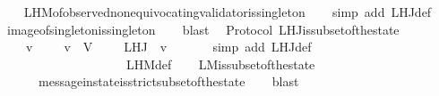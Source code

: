 \begin{isabellebody}
%
\isadelimproof
\ \ %
\endisadelimproof
%
\isatagproof
{}\isamarkupfalse%
\ L{\isacharunderscore}H{\isacharunderscore}M{\isacharunderscore}of{\isacharunderscore}observed{\isacharunderscore}non{\isacharunderscore}equivocating{\isacharunderscore}validator{\isacharunderscore}is{\isacharunderscore}singleton\isanewline
\ \ \isamarkupfalse%
\ {\isacharparenleft}simp\ add{\isacharcolon}\ L{\isacharunderscore}H{\isacharunderscore}J{\isacharunderscore}def{\isacharparenright}\isanewline
\ \ \isamarkupfalse%
\ image{\isacharunderscore}of{\isacharunderscore}singleton{\isacharunderscore}is{\isacharunderscore}singleton\isanewline
\ \ \isamarkupfalse%
\ blast%
\endisatagproof
{\isafoldproof}%
%
\isadelimproof
\isanewline
%
\endisadelimproof
\isanewline
{}\isamarkupfalse%
\ {\isacharparenleft}\ Protocol{\isacharparenright}\ L{\isacharunderscore}H{\isacharunderscore}J{\isacharunderscore}is{\isacharunderscore}subset{\isacharunderscore}of{\isacharunderscore}the{\isacharunderscore}state\ {\isacharcolon}\isanewline
\ \ {\isachardoublequoteopen}{\isasymforall}\ {\isasymsigma}\ v{\isachardot}\ {\isasymsigma}\ {\isasymin}\ {\isasymSigma}\ {\isasymand}\ v\ {\isasymin}\ V\ {\isasymlongrightarrow}\ {\isacharparenleft}{\isasymforall}\ {\isasymsigma}{\isacharprime}\ {\isasymin}\ L{\isacharunderscore}H{\isacharunderscore}J\ {\isasymsigma}\ v{\isachardot}\ {\isasymsigma}{\isacharprime}\ {\isasymsubset}\ {\isasymsigma}{\isacharparenright}{\isachardoublequoteclose}\isanewline
%
\isadelimproof
\ \ %
\endisadelimproof
%
\isatagproof
{}\isamarkupfalse%
\ {\isacharparenleft}simp\ add{\isacharcolon}\ L{\isacharunderscore}H{\isacharunderscore}J{\isacharunderscore}def\isanewline
\ \ \ \ \ \ \ \ \ \ \ \ \ \ \ \ \ \ \ \ L{\isacharunderscore}H{\isacharunderscore}M{\isacharunderscore}def{\isacharparenright}\isanewline
\ \ \isamarkupfalse%
\ L{\isacharunderscore}M{\isacharunderscore}is{\isacharunderscore}subset{\isacharunderscore}of{\isacharunderscore}the{\isacharunderscore}state\isanewline
\ \ \ \ \ \ message{\isacharunderscore}in{\isacharunderscore}state{\isacharunderscore}is{\isacharunderscore}strict{\isacharunderscore}subset{\isacharunderscore}of{\isacharunderscore}the{\isacharunderscore}state\isanewline
\ \ \isamarkupfalse%
\ blast%
\endisatagproof
{\isafoldproof}%
%
\isadelimproof
\isanewline
%
\endisadelimproof
\isanewline
%
\isadelimtheory
\isanewline
%
\endisadelimtheory
%
\isatagtheory
{}\isamarkupfalse%
%
\endisatagtheory
{\isafoldtheory}%
%
\isadelimtheory
%
\endisadelimtheory
%
\end{isabellebody}%

